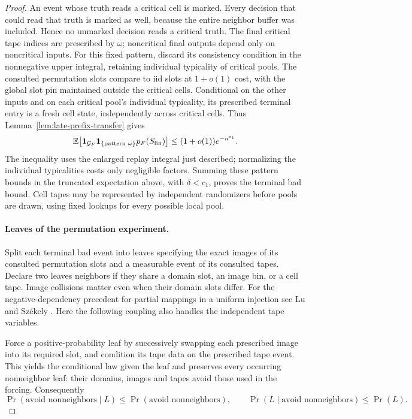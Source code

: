 \begin{proof}
An event whose truth reads a critical cell is marked. Every decision
that could read that truth is marked as well, because the entire
neighbor buffer was included. Hence no unmarked decision reads a
critical truth. The final critical tape indices are prescribed by
\(\omega\); noncritical final outputs depend only on noncritical
inputs. For this fixed pattern, discard its consistency condition in
the nonnegative upper integral, retaining individual typicality of
critical pools. The consulted permutation slots compare to iid slots
at \(1+o(1)\) cost, with the global slot pin maintained outside the
critical cells. Conditional on the other inputs and on each critical
pool's individual typicality, its prescribed terminal entry is a
fresh cell state, independently across critical cells. Thus
Lemma~\ref{lem:late-prefix-transfer} gives
\[
 \mathbb E\big[\mathbf1_{\mathcal G_F}
                  \mathbf1_{\{\text{pattern }\omega\}}
                  p_F(S_{\rm fin})\big]
 \le (1+o(1))e^{-n^{c_1}}.
\]
The inequality uses the enlarged replay integral just described;
normalizing the individual typicalities costs only negligible factors.
Summing these pattern bounds in the truncated expectation above,
with \(\delta<c_1\), proves the terminal bad bound. Cell tapes may be
represented by independent randomizers before pools are drawn, using
fixed lookups for every possible local pool.

\paragraph{Leaves of the permutation experiment.}
Split each terminal bad event into leaves specifying the exact images
of its consulted permutation slots and a measurable event of its
consulted tapes. Declare two leaves neighbors if they share a domain
slot, an image bin, or a cell tape. Image collisions matter even when
their domain slots differ. For the negative-dependency precedent for
partial mappings in a uniform injection see Lu and Sz\'ekely
\cite[Theorem~1]{lu-szekely2007}. Here the following coupling also
handles the independent tape variables.

Force a positive-probability leaf by successively swapping each
prescribed image into its required slot, and condition its tape data
on the prescribed tape event. This yields the conditional law given
the leaf and preserves every occurring nonneighbor leaf: their domains,
images and tapes avoid those used in the forcing. Consequently
\[
 \Pr(\text{avoid nonneighbors}\mid L)
 \le\Pr(\text{avoid nonneighbors}),\qquad
 \Pr(L\mid\text{avoid nonneighbors})\le\Pr(L).
\]


\end{proof}
